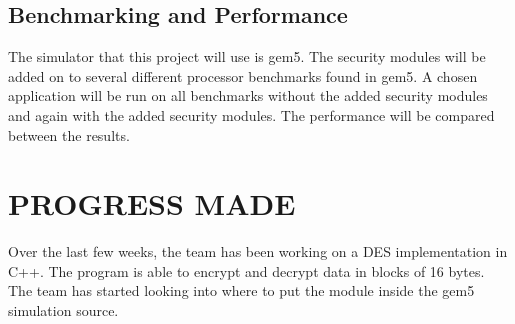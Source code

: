 \documentclass[letterpaper, 10 pt, conference]{ieeeconf}  %
\begin{document}
\subsection{Benchmarking and Performance}

The simulator that this project will use is gem5. The security modules will be added on to several different processor benchmarks found in gem5. A chosen application will be run on all benchmarks without the added security modules and again with the added security modules. The performance will be compared between the results.

\section{PROGRESS MADE}

Over the last few weeks, the team has been working on a DES implementation in C++. The program is able to encrypt and decrypt data in blocks of 16 bytes. The team has started looking into where to put the module inside the gem5 simulation source. 


\addtolength{\textheight}{-12cm}   %













\end{document}
